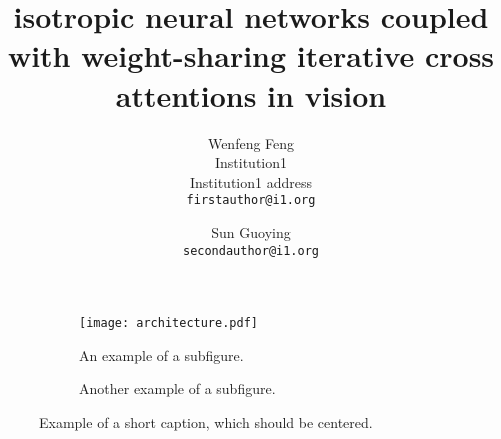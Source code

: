 \documentclass[10pt,twocolumn,letterpaper]{article}
\title{
    isotropic neural networks coupled with weight-sharing iterative cross attentions in vision
}
\author{Wenfeng Feng\\
Institution1\\
Institution1 address\\
{\tt\small firstauthor@i1.org}
\and
Sun Guoying\\
{\tt\small secondauthor@i1.org}
}
\begin{document}
\maketitle

\begin{figure*}
    \centering
    \begin{subfigure}{0.68\linewidth}
      \texttt{[image: architecture.pdf]}
      \caption{An example of a subfigure.}
      \label{fig:short-a}
    \end{subfigure}
    \hfill
    \begin{subfigure}{0.28\linewidth}
      \fbox{\rule{0pt}{2in} \rule{.9\linewidth}{0pt}}
      \caption{Another example of a subfigure.}
      \label{fig:short-b}
    \end{subfigure}
    \caption{Example of a short caption, which should be centered.}
    \label{fig:architecture}
  \end{figure*}  

    


% 
{
    \small
    
    
}

% 
\end{document}
